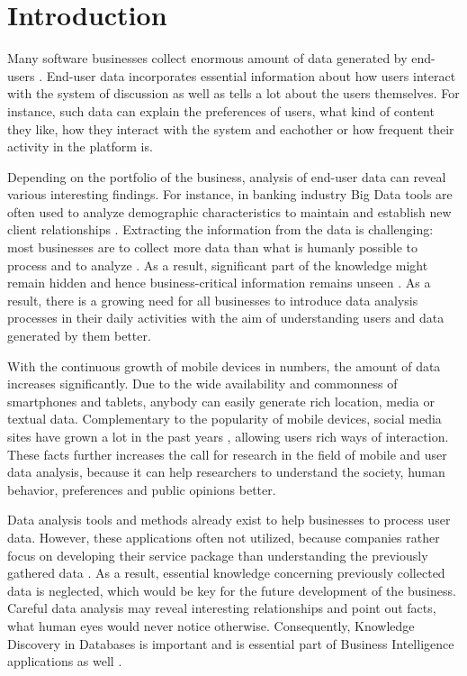 \documentclass[conference]{IEEEtran}
\begin{document}
\section{Introduction}

Many software businesses collect enormous amount of data generated by end-users \cite{chinesemobilebankingusers, bigdatamanagementrevolution, inmon2007tapping}. End-user data incorporates essential information about how users interact with the system of discussion as well as tells a lot about the users themselves. For instance, such data can explain the preferences of users, what kind of content they like, how they interact with the system and eachother or how frequent their activity in the platform is.

 Depending on the portfolio of the business, analysis of end-user data can reveal various interesting findings. For instance, in banking industry Big Data tools are often used to analyze demographic characteristics to maintain and establish new client relationships \cite{chinesemobilebankingusers, bigdatamanagementrevolution}. Extracting the information from the data is challenging: most businesses are to collect more data than what is humanly possible to process and to analyze \cite{inmon2007tapping, wegener2010integrating}. As a result, significant part of the knowledge might remain hidden and hence business-critical information remains unseen \cite{inmon2007tapping, wegener2010integrating, introtodatamining, chinesemobilebankingusers}. As a result, there is a growing need for all businesses to introduce data analysis processes in their daily activities with the aim of understanding users and data generated by them better.

 With the continuous growth of mobile devices in numbers, the amount of data increases significantly. Due to the wide availability and commonness of smartphones and tablets, anybody can easily generate rich location, media or textual data. Complementary to the popularity of mobile devices, social media sites have grown a lot in the past years \cite{ottoni2013ladies, hu2014we, bakhshi2014faces}, allowing users rich ways of interaction. These facts further increases the call for research in the field of mobile and user data analysis, because it can help researchers to understand the society, human behavior, preferences and public opinions better. 

 Data analysis tools and methods already exist to help businesses to process user data. However, these applications often not utilized, because companies rather focus on developing their service package than understanding the previously gathered data \cite{inmon2007tapping, bigdatamanagementrevolution}. As a result, essential knowledge concerning previously collected data is neglected, which would be key for the future development of the business. Careful data analysis may reveal interesting relationships and point out facts, what human eyes would never notice otherwise. Consequently, Knowledge Discovery in Databases is important and is essential part of Business Intelligence applications as well \cite{zarsky2002mine, bigdatamanagementrevolution}.
\end{document}
